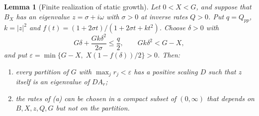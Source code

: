 \documentclass[11pt,a4paper]{article}
\theoremstyle{plain}
\newtheorem{lemma}[theorem]{Lemma}
\theoremstyle{definition}
\theoremstyle{remark}
\begin{document}
\begin{lemma}[Finite realization of static growth]\label{lem:finite}
Let $0<X<G$, and suppose that $B_X$ has an eigenvalue $z=\sigma+i\omega$ with
$\sigma>0$ at inverse rates $Q>0$. Put $q=Q_{pp}$, $k=|z|^2$ and
$f(t)=(1+2\sigma t)/(1+2\sigma t+kt^2)$. Choose $\delta>0$ with
\begin{equation}\label{eq:quant}
 G\delta+\frac{Gk\delta^2}{2\sigma}\le\frac q2,\qquad Gk\delta^2<G-X,
\end{equation}
and put $\varepsilon=\min\{G-X,\;X(1-f(\delta))/2\}>0$. Then:
\begin{enumerate}[label=(\alph*)]
\item every partition of $G$ with $\max_jr_j<\varepsilon$ has a positive
scaling $D$ such that $z$ itself is an eigenvalue of $DA_r$;
\item the rates of (a) can be chosen in a compact subset of $(0,\infty)$ that
depends on $B,X,z,Q,G$ but not on the partition.
\end{enumerate}
\end{lemma}
\end{document}
